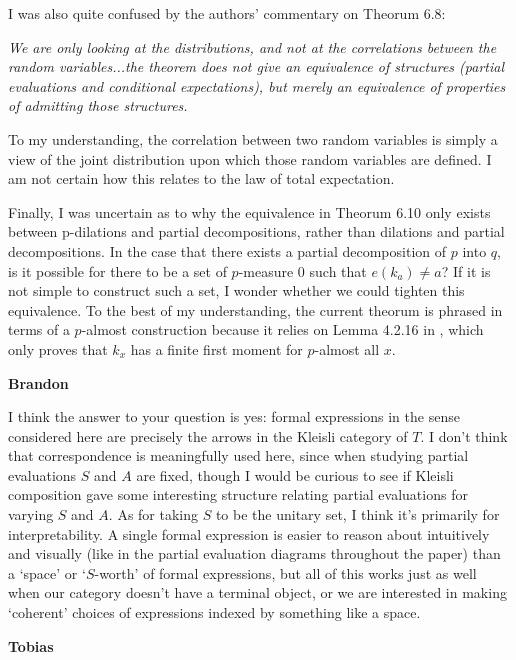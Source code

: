 \documentclass{amsart}
\newcommand{\respond}[1]{
  \vspace{1em} \textbf{#1}
}
\begin{document}
I was also quite confused by the authors' commentary on Theorum 6.8:

\textit{We are only looking at the distributions, and not at the correlations between the random variables...the theorem does not give an equivalence of structures (partial evaluations and conditional expectations), but merely an equivalence of properties of admitting those structures.}

To my understanding, the correlation between two random variables is simply a view of the joint distribution upon which those random variables are defined. I am not certain how this relates to the law of total expectation.

Finally, I was uncertain as to why the equivalence in Theorum 6.10 only exists between p-dilations and partial decompositions, rather than dilations and partial decompositions. In the case that there exists a partial decomposition of $p$ into $q$, is it possible for there to be a set of $p$-measure $0$ such that $e(k_a) \neq a$? If it is not simple to construct such a set, I wonder whether we could tighten this equivalence. To the best of my understanding, the current theorum is phrased in terms of a $p$-almost construction because it relies on Lemma 4.2.16 in \cite{stochasticdominancemetricspaces}, which only proves that $k_x$ has a finite first moment for $p$-almost all $x$.

\respond{Brandon}

I think the answer to your question is yes: formal expressions in the sense considered here are precisely the arrows in the Kleisli category of $T$. I don't think that correspondence is meaningfully used here, since when studying partial evaluations $S$ and $A$ are fixed, though I would be curious to see if Kleisli composition gave some interesting structure relating partial evaluations for varying $S$ and $A$.  As for taking $S$ to be the unitary set, I think it's primarily for interpretability.  A single formal expression is easier to reason about intuitively and visually (like in the partial evaluation diagrams throughout the paper) than a `space' or `$S$-worth' of formal expressions, but all of this works just as well when our category doesn't have a terminal object, or we are interested in making `coherent' choices of expressions indexed by something like a space.

\respond{Tobias}
\end{document}
